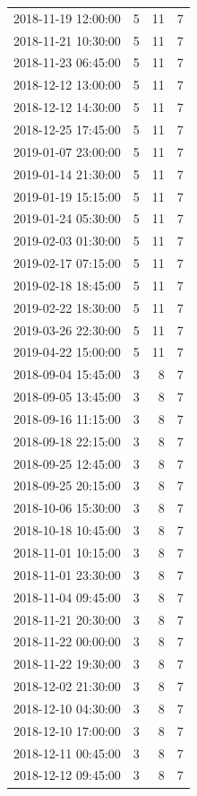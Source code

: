 \begin{tabular}{lrrr}
2018-11-19 12:00:00 & 5 & 11 & 7 \\
2018-11-21 10:30:00 & 5 & 11 & 7 \\
2018-11-23 06:45:00 & 5 & 11 & 7 \\
2018-12-12 13:00:00 & 5 & 11 & 7 \\
2018-12-12 14:30:00 & 5 & 11 & 7 \\
2018-12-25 17:45:00 & 5 & 11 & 7 \\
2019-01-07 23:00:00 & 5 & 11 & 7 \\
2019-01-14 21:30:00 & 5 & 11 & 7 \\
2019-01-19 15:15:00 & 5 & 11 & 7 \\
2019-01-24 05:30:00 & 5 & 11 & 7 \\
2019-02-03 01:30:00 & 5 & 11 & 7 \\
2019-02-17 07:15:00 & 5 & 11 & 7 \\
2019-02-18 18:45:00 & 5 & 11 & 7 \\
2019-02-22 18:30:00 & 5 & 11 & 7 \\
2019-03-26 22:30:00 & 5 & 11 & 7 \\
2019-04-22 15:00:00 & 5 & 11 & 7 \\
2018-09-04 15:45:00 & 3 & 8 & 7 \\
2018-09-05 13:45:00 & 3 & 8 & 7 \\
2018-09-16 11:15:00 & 3 & 8 & 7 \\
2018-09-18 22:15:00 & 3 & 8 & 7 \\
2018-09-25 12:45:00 & 3 & 8 & 7 \\
2018-09-25 20:15:00 & 3 & 8 & 7 \\
2018-10-06 15:30:00 & 3 & 8 & 7 \\
2018-10-18 10:45:00 & 3 & 8 & 7 \\
2018-11-01 10:15:00 & 3 & 8 & 7 \\
2018-11-01 23:30:00 & 3 & 8 & 7 \\
2018-11-04 09:45:00 & 3 & 8 & 7 \\
2018-11-21 20:30:00 & 3 & 8 & 7 \\
2018-11-22 00:00:00 & 3 & 8 & 7 \\
2018-11-22 19:30:00 & 3 & 8 & 7 \\
2018-12-02 21:30:00 & 3 & 8 & 7 \\
2018-12-10 04:30:00 & 3 & 8 & 7 \\
2018-12-10 17:00:00 & 3 & 8 & 7 \\
2018-12-11 00:45:00 & 3 & 8 & 7 \\
2018-12-12 09:45:00 & 3 & 8 & 7 \\

\end{tabular}
